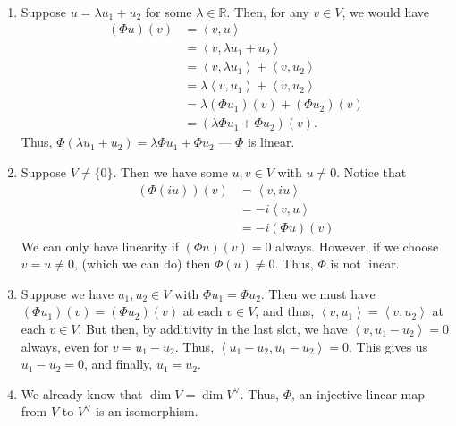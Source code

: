 \documentclass[12pt, letterpaper]{hmcpset}
\begin{document}
\begin{solution}~
	\begin{enumerate}
		\item Suppose $u = \lambda u_{1} + u_{2}$ for some $\lambda \in \mathbb{R}$. Then, for any $v \in V$, we would have
			\[
				\begin{split}
					(\Phi u)(v) & = \left < v, u \right > \\
						    & = \left < v, \lambda u_{1} + u_{2} \right > \\
						    & = \left < v, \lambda u_{1} \right > + \left < v, u_{2} \right > \\
						    & = \lambda \left < v, u_{1} \right > + \left < v, u_{2} \right > \\
						    & = \lambda (\Phi u_{1})(v) + (\Phi u_{2})(v) \\
						    & = (\lambda \Phi u_{1} + \Phi u_{2})(v).
				\end{split}
			\]
			Thus, $\Phi (\lambda u_{1} + u_{2}) = \lambda \Phi u_{1} + \Phi u_{2}$ --- $\Phi$ is linear.
		\item Suppose $V \neq \{ 0 \}$. Then we have some $u, v \in V$ with $u \neq 0$. Notice that
			\[
				\begin{split}
					(\Phi (iu))(v) & = \left < v, iu \right > \\
						    & = -i \left < v, u \right > \\
						    & = - i (\Phi u)(v)
				\end{split}
			\]
			We can only have linearity if $(\Phi u)(v) = 0$ always. However, if we choose $v = u \neq 0$, (which we can do) then $\Phi(u) \neq 0$. Thus, $\Phi$ is not linear.
		\item Suppose we have $u_{1}, u_{2} \in V$ with $\Phi u_{1} = \Phi u_{2}$. Then we must have $(\Phi u_{1})(v) = (\Phi u_{2})(v)$ at each $v \in V$, and thus, $\left < v, u_{1} \right > = \left < v, u_{2} \right >$ at each $v \in V$. But then, by additivity in the last slot, we have $\left < v, u_{1} - u_{2} \right > = 0$ always, even for $v = u_{1} - u_{2}$. Thus, $\left < u_{1} - u_{2}, u_{1} - u_{2} \right > = 0$. This gives us $u_{1} - u_{2} = 0$, and finally, $u_{1} = u_{2}$.
		\item We already know that $\dim V = \dim V^{\vee}$. Thus, $\Phi$, an injective linear map from $V$ to $V^{\vee}$ is an isomorphism.
	\end{enumerate}
\end{solution}
\end{document}
